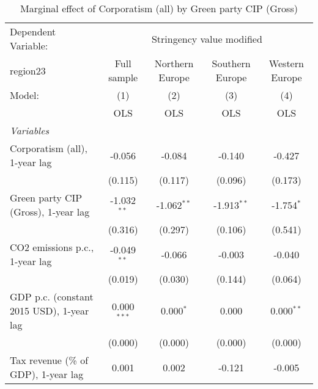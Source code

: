 
\begin{table}[htbp]
   \caption{Marginal effect of Corporatism (all) by Green party CIP (Gross)}
   \centering
   \begin{tabular}{lcccc}
      \toprule
      Dependent Variable: & \multicolumn{4}{c}{Stringency value modified}\\
      region23                                                            & Full sample   & Northern Europe & Southern Europe & Western Europe \\   
      Model:                                                              & (1)           & (2)             & (3)             & (4)\\  
                                                                          &  OLS          & OLS             & OLS             & OLS\\  
      \midrule
      \emph{Variables}\\
      Corporatism (all), 1-year lag                                       & -0.056        & -0.084          & -0.140          & -0.427\\   
                                                                          & (0.115)       & (0.117)         & (0.096)         & (0.173)\\   
      Green party CIP (Gross), 1-year lag                                 & -1.032$^{**}$ & -1.062$^{**}$   & -1.913$^{**}$   & -1.754$^{*}$\\   
                                                                          & (0.316)       & (0.297)         & (0.106)         & (0.541)\\   
      CO2 emissions p.c., 1-year lag                                      & -0.049$^{**}$ & -0.066          & -0.003          & -0.040\\   
                                                                          & (0.019)       & (0.030)         & (0.144)         & (0.064)\\   
      GDP p.c. (constant 2015 USD), 1-year lag                            & 0.000$^{***}$ & 0.000$^{*}$     & 0.000           & 0.000$^{**}$\\   
                                                                          & (0.000)       & (0.000)         & (0.000)         & (0.000)\\   
      Tax revenue (\% of GDP), 1-year lag                                 & 0.001         & 0.002           & -0.121          & -0.005\\   

\end{tabular}
\end{table}
